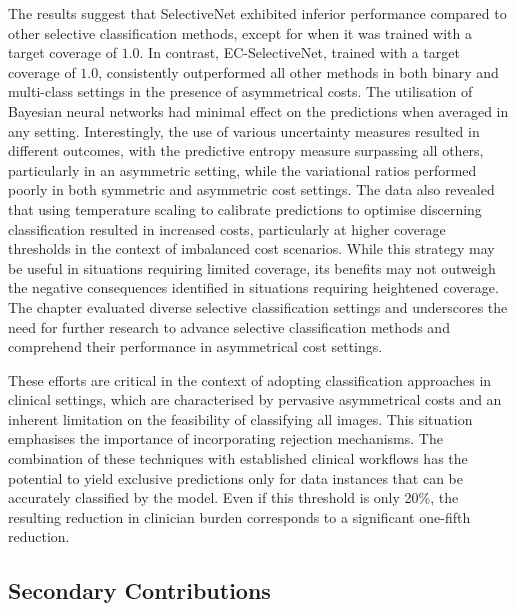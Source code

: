 The results suggest that SelectiveNet exhibited inferior performance compared to other selective classification methods, except for when it was trained with a target coverage of $1.0$. In contrast, EC-SelectiveNet, trained with a target coverage of $1.0$, consistently outperformed all other methods in both binary and multi-class settings in the presence of asymmetrical costs. The utilisation of Bayesian neural networks had minimal effect on the predictions when averaged in any setting. Interestingly, the use of various uncertainty measures resulted in different outcomes, with the predictive entropy measure surpassing all others, particularly in an asymmetric setting, while the variational ratios performed poorly in both symmetric and asymmetric cost settings. The data also revealed that using temperature scaling to calibrate predictions to optimise discerning classification resulted in increased costs, particularly at higher coverage thresholds in the context of imbalanced cost scenarios. While this strategy may be useful in situations requiring limited coverage, its benefits may not outweigh the negative consequences identified in situations requiring heightened coverage. The chapter evaluated diverse selective classification settings and underscores the need for further research to advance selective classification methods and comprehend their performance in asymmetrical cost settings. 

These efforts are critical in the context of adopting classification approaches in clinical settings, which are characterised by pervasive asymmetrical costs and an inherent limitation on the feasibility of classifying all images. This situation emphasises the importance of incorporating rejection mechanisms. The combination of these techniques with established clinical workflows has the potential to yield exclusive predictions only for data instances that can be accurately classified by the model. Even if this threshold is only 20\%, the resulting reduction in clinician burden corresponds to a significant one-fifth reduction.


\subsection{Secondary Contributions}

